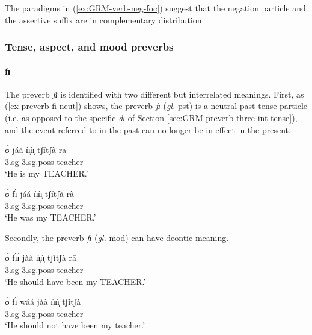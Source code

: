 \begin{exe}
\begin{exe}
\begin{exe}
{\begin{exe}
\begin{exe}
\begin{exe}
\begin{exe}
\begin{exe}
\begin{exe}
\begin{exe}
\begin{xlist}
\begin{exe}
\begin{exe}
\begin{exe}
\begin{exe}
\begin{exe}
\begin{exe}
\begin{exe}
\begin{exe}
\begin{exe}
\begin{exe}
\begin{exe}
\begin{exe}
\begin{exe}
\begin{exe}
\z 
 \z

The paradigms in (\ref{ex:GRM-verb-neg-foc})  suggest that the negation particle 
and the assertive suffix are in complementary distribution. 

\subsubsection{Tense, aspect, and mood preverbs}
\label{sec:GRM-verb-neg}


\paragraph{fɪ}

The preverb {\it fɪ}   is identified with two different but interrelated 
meanings.  First, as (\ref{ex-preverb-fi-neut}) shows, the preverb {\it fɪ}  
({\it gl.} {\sc pst}) is a neutral past tense particle (i.e.  as opposed to the 
specific  {\it dɪ} of  Section \ref{sec:GRM-preverb-three-int-tense}), and the 
event referred to in the past can no longer be in effect in the present.


\ea\label{ex-preverb-fi-neut}

\ea
\gll ʊ̀ jáá  ǹ̩ǹ̩ tʃítʃà rā \\
  {\sc 3.sg} {\ident}    {\sc 3.sg.poss}  teacher {\foc}  \\
\glt  `He is my TEACHER.' 

\ex
\gll   ʊ̀  fɪ̀ jáá  ǹ̩ǹ̩ tʃítʃà rà\\
        {\sc 3.sg} {\pst} {\ident}    {\sc 3.sg.poss}  teacher {\foc}  \\  
\glt  `He was my TEACHER.' 

\z 
 \z 

 Secondly, the preverb {\it fɪ}   ({\it gl.} {\sc mod}) can have  deontic
meaning.  


\ea\label{ex-preverb-fi-deonc}

\ea\label{ex-preverb-fi-deonc-pos}
\gll ʊ̀ fɪ̀ɪ́ jàà  ǹ̩ǹ̩ tʃítʃà rā \\
  {\sc 3.sg}  {\mod}  {\ident}    {\sc 3.sg.poss}  teacher {\foc}  \\
\glt  `He should have been my TEACHER.' 

\ex
\gll    ʊ̀ fɪ̀ wáá jàà  ǹ̩ǹ̩ tʃítʃà \\
        {\sc 3.sg} {\mod} {\neg} {\ident}    {\sc 3.sg.poss}  teacher   \\  
\glt   `He should not have been my teacher.'  



\end{exe}
\end{exe}
\end{exe}
\end{exe}
\end{exe}
\end{exe}
\end{exe}
\end{exe}
\end{exe}
\end{exe}
\end{exe}
\end{exe}
\end{exe}
\end{exe}
\end{xlist}
\end{exe}
\end{exe}
\end{exe}
\end{exe}
\end{exe}
\end{exe}
\end{exe}}
\end{exe}
\end{exe}
\end{exe}
